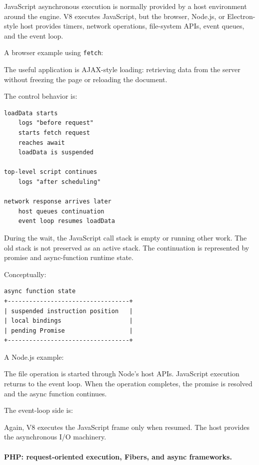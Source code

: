 JavaScript asynchronous execution is normally provided by a host environment around the engine. V8 executes JavaScript, but the browser, Node.js, or Electron-style host provides timers, network operations, file-system APIs, event queues, and the event loop.

A browser example using \texttt{fetch}:

The useful application is AJAX-style loading: retrieving data from the server without freezing the page or reloading the document.

The control behavior is:

\begin{verbatim}
loadData starts
    logs "before request"
    starts fetch request
    reaches await
    loadData is suspended

top-level script continues
    logs "after scheduling"

network response arrives later
    host queues continuation
    event loop resumes loadData
\end{verbatim}

During the wait, the JavaScript call stack is empty or running other work. The old stack is not preserved as an active stack. The continuation is represented by promise and async-function runtime state.

Conceptually:

\begin{verbatim}
async function state
+----------------------------------+
| suspended instruction position   |
| local bindings                   |
| pending Promise                  |
+----------------------------------+
\end{verbatim}

A Node.js example:

The file operation is started through Node's host APIs. JavaScript execution returns to the event loop. When the operation completes, the promise is resolved and the async function continues.

The event-loop side is:

Again, V8 executes the JavaScript frame only when resumed. The host provides the asynchronous I/O machinery.

\paragraph{PHP: request-oriented execution, Fibers, and async frameworks.}

